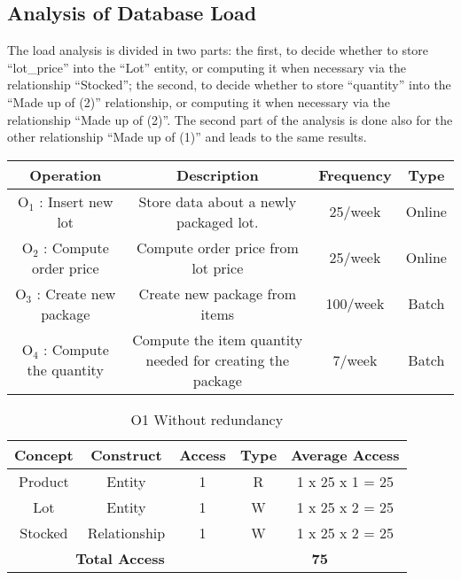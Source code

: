 \subsection{Analysis of Database Load}
The load analysis is divided in two parts: the first, to decide whether to store ``lot\_price'' into the ``Lot'' entity, or computing it when necessary via the relationship ``Stocked''; the second, to decide whether to store ``quantity'' into the ``Made up of (2)'' relationship, or computing it when necessary via the relationship ``Made up of (2)''. The second part of the analysis is done also for the other relationship ``Made up of (1)'' and leads to the same results.

\begin{center}
	\begin{tabular}[!h]{ | c | c | c | c | }
		\hline
		\textbf{Operation} & \textbf{Description} & \textbf{Frequency} & \textbf{Type} \\ \hline
		$ \textrm{O}_\textrm{1} $ : Insert new lot & Store data about a newly packaged lot. & 25/week & Online \\ \hline
		$ \textrm{O}_\textrm{2} $ : Compute order price  & Compute order price from lot price & 25/week & Online \\\hline
		$ \textrm{O}_\textrm{3} $ : Create new package & Create new package from items & 100/week & Batch \\\hline
		$ \textrm{O}_\textrm{4} $ : Compute the quantity & Compute the item quantity needed for creating the package & 7/week & Batch \\\hline
	\end{tabular}
\end{center}
\newpage
\begin{table}[!h]\caption{O1 Without redundancy}
	\begin{center}
		\begin{tabular}{| c | c | c | c | c |}
			\hline
			\textbf{Concept} & \textbf{Construct} & \textbf{Access} & \textbf{Type} & \textbf{Average Access} \\ \hline
			Product & Entity & 1 & R & 1 x 25 x 1 = 25 \\ \hline
			Lot & Entity & 1 & W & 1 x 25 x 2 = 25 \\ \hline
			Stocked & Relationship & 1 & W & 1 x 25 x 2 = 25 \\ \hline
			\multicolumn{3}{|c|}{\textbf{Total Access}} & \multicolumn{2}{|c|}{\textbf{75}} \\ \hline
		\end{tabular}
	\end{center}
\end{table}
